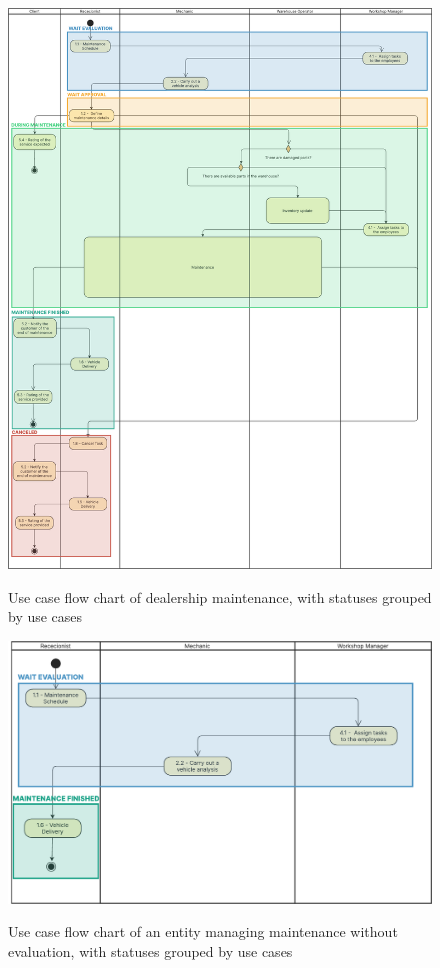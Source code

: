 \begin{figure}[h]
  \caption{Use case flow chart of dealership maintenance, with statuses grouped by use cases}
  \centering
  \includegraphics[width=\textwidth]{figs/Status/Maintenance/UseCaseStatus}
  \label{fig:maintenanceUseCaseStatus}
\end{figure}


\begin{figure}[h]
  \caption{Use case flow chart of an entity managing maintenance without evaluation, with statuses grouped by use cases}
  \centering
  \includegraphics[width=\textwidth]{figs/Status/Maintenance/EntityDiagram}
  \label{fig:maintenanceDealershipUseCaseStatus}
\end{figure}


